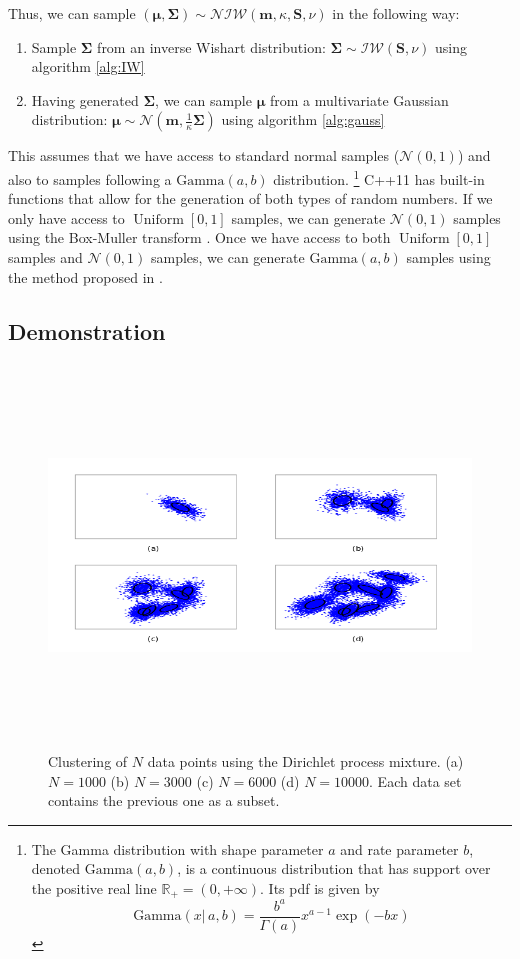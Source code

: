 \documentclass[final,3p,times,twocolumn]{elsarticle}
\DeclareMathOperator*{\Uniform}{Uniform}
\let\bs\boldsymbol
\begin{document}
Thus, we can sample $(\bs\mu,\bs\Sigma)\sim\mathcal{NIW}(\bs m,\kappa,\bs S,\nu)$ in the following way:
\begin{enumerate}
\item Sample $\bs\Sigma$ from an inverse Wishart distribution: $\bs\Sigma \sim \mathcal{IW}(\bs S,\nu)$ using algorithm \ref{alg:IW}
\item Having generated $\bs\Sigma$, we can sample $\bs\mu$ from a multivariate Gaussian distribution: $\bs\mu \sim \mathcal{N}(\bs m,\frac{1}{\kappa}\bs\Sigma)$ using algorithm \ref{alg:gauss}
\end{enumerate}
This assumes that we have access to standard normal samples ($\mathcal{N}(0,1)$) and also to samples following a $\mbox{Gamma}(a,b)$ distribution.
\footnote{The Gamma distribution with shape parameter $a$ and rate parameter $b$, denoted $\mbox{Gamma}(a,b)$, is a continuous distribution that has support over the positive real line $\mathbb{R}_+ = (0,+\infty)$.
Its pdf is given by
\[
\mbox{Gamma}(x|\,a,b) = \frac{b^a}{\Gamma\left(a\right)} x^{a-1} \exp \left(-bx\right)
\]
}
C++11 has built-in functions that allow for the generation of both types of random numbers.
If we only have access to $\Uniform[0,1]$ samples, we can generate $\mathcal{N}(0,1)$ samples using the Box-Muller transform \cite{box1958}.
Once we have access to both $\Uniform[0,1]$ samples and $\mathcal{N}(0,1)$ samples, we can generate $\mbox{Gamma}(a,b)$ samples using the method proposed in \cite{marsaglia2000}.


\subsection{Demonstration}

\begin{figure}
\includegraphics[width=\textwidth,height=4in]{drawing.png}
\caption{Clustering of $N$ data points using the Dirichlet process mixture.
(a) $N=1000$ (b) $N=3000$ (c) $N=6000$ (d) $N=10000$.
Each data set contains the previous one as a subset.}
\label{fig:size}
\end{figure}
\end{document}
